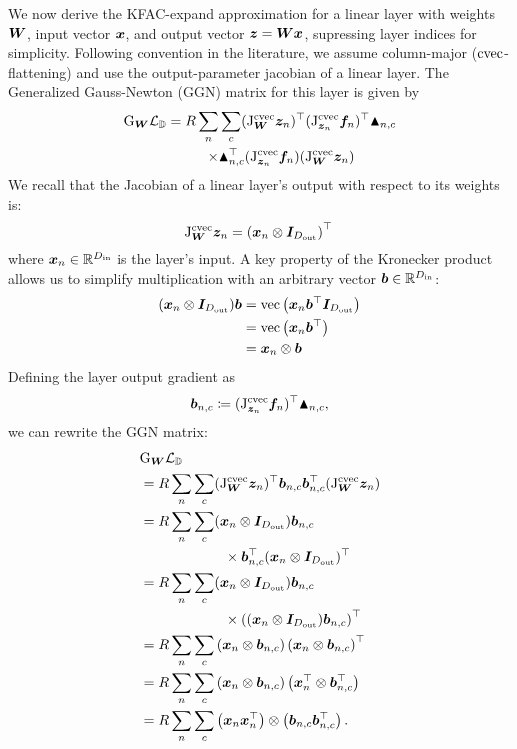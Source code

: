 We now derive the KFAC-expand approximation for a linear layer with weights ${\bm{W}}$, input vector ${\bm{x}}$, and output vector ${\bm{z}} = {\bm{W}}{\bm{x}}$, supressing layer indices for simplicity. Following convention in the literature, we assume column-major ($\operatorname{cvec}$-flattening) and use the output-parameter jacobian of a linear layer. The Generalized Gauss-Newton (GGN) matrix for this layer is given by
\begin{align*}
  \mathrm{G}_{{\bm{W}}} {\mathcal{L}}_{{\mathbb{D}}}
  =
    R
    \sum_n &\sum_c
    (\mathrm{J}^{\operatorname{cvec}}_{{\bm{W}}}{\bm{z}}_n)^{\top}
    (\mathrm{J}^{\operatorname{cvec}}_{{\bm{z}}_n}{\bm{f}}_n)^{\top}
    \blacktriangle_{n,c} \\
    \times
    &\blacktriangle_{n,c}^{\top}
    (\mathrm{J}^{\operatorname{cvec}}_{{\bm{z}}_n}{\bm{f}}_n)
    (\mathrm{J}^{\operatorname{cvec}}_{{\bm{W}}}{\bm{z}}_n)
\end{align*}
We recall that the Jacobian of a linear layer's output with respect to its weights is:
$$ \mathrm{J}^{\operatorname{cvec}}_{{\bm{W}}}{\bm{z}}_n = \left({\bm{x}}_n \otimes {\bm{I}}_{D_{\text{out}}}\right)^{\top}\, $$
where ${\bm{x}}_n \in \mathbb{R}^{D_\text{in}}$ is the layer's input.
A key property of the Kronecker product allows us to simplify multiplication with an arbitrary vector ${\bm{b}} \in {\mathbb{R}}^{D_{\text{in}}}$:
\begin{align*}
  ({\bm{x}}_n \otimes {\bm{I}}_{D_{\text{out}}}) {\bm{b}} &= \text{vec}\left({\bm{x}}_n {\bm{b}}^{\top}{\bm{I}}_{D_{\text{out}}}\right) \\
  &= \text{vec}\left( {\bm{x}}_n {\bm{b}}^{\top} \right) \\
  &= {\bm{x}}_n \otimes {\bm{b}}
\end{align*}
Defining the layer output gradient as $${\bm{b}}_{n,c} \coloneq (\mathrm{J}^{\operatorname{cvec}}_{{\bm{z}}_n}{\bm{f}}_n)^{\top} \blacktriangle_{n,c},$$ we can rewrite the GGN matrix:
\begin{align*}
  &\mathrm{G}_{{\bm{W}}} {\mathcal{L}}_{{\mathbb{D}}} \\
  &= R \sum_n \sum_c
  (\mathrm{J}^{\operatorname{cvec}}_{{\bm{W}}}{\bm{z}}_n)^{\top}
  {\bm{b}}_{n,c} {\bm{b}}_{n,c}^{\top}
  (\mathrm{J}^{\operatorname{cvec}}_{{\bm{W}}}{\bm{z}}_n) \\
  &= R \sum_n \sum_c ({\bm{x}}_n \otimes {\bm{I}}_{D_{\text{out}}}) {\bm{b}}_{n,c} \\
  & \qquad \qquad \qquad \times{\bm{b}}_{n,c}^{\top}
  ({\bm{x}}_n \otimes {\bm{I}}_{D_{\text{out}}})^{\top} \\
  &= R \sum_n \sum_c ({\bm{x}}_n \otimes {\bm{I}}_{D_{\text{out}}}) {\bm{b}}_{n,c} \\
  & \qquad \qquad \qquad \times \left(({\bm{x}}_n \otimes {\bm{I}}_{D_{\text{out}}}) {\bm{b}}_{n,c} \right)^{\top} \\
  &= R \sum_n \sum_c \left( {\bm{x}}_n \otimes {\bm{b}}_{n,c} \right)
  \left( {\bm{x}}_n \otimes {\bm{b}}_{n,c} \right)^{\top} \\
  &= R \sum_n \sum_c \left( {\bm{x}}_n \otimes {\bm{b}}_{n,c} \right)
  \left( {\bm{x}}_n^{\top} \otimes {\bm{b}}_{n,c}^{\top} \right) \\
  &= R \sum_n \sum_c \left({\bm{x}}_n {\bm{x}}_n^{\top}\right) \otimes \left({\bm{b}}_{n,c} {\bm{b}}_{n,c}^{\top}\right).
\end{align*}

